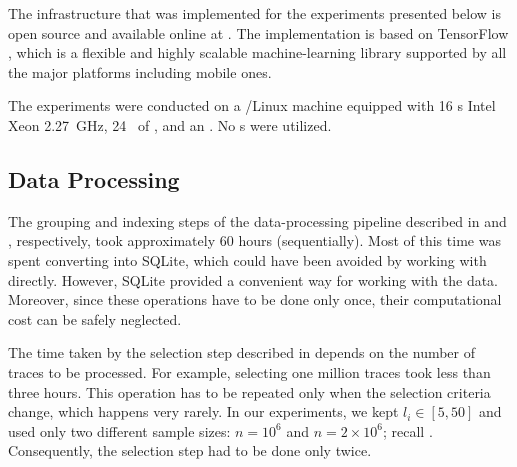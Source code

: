 The infrastructure that was implemented for the experiments presented below is
open source and available online at \cite{sources}. The implementation is based
on TensorFlow \cite{abadi2015}, which is a flexible and highly scalable
machine-learning library supported by all the major platforms including mobile
ones.

The experiments were conducted on a /Linux machine equipped with 16
s Intel Xeon  2.27~GHz, 24~ of , and an
. No s were utilized.

\subsection{Data Processing}
The grouping and indexing steps of the data-processing pipeline described in
 and , respectively, took approximately 60 hours
(sequentially). Most of this time was spent converting  into SQLite,
which could have been avoided by working with  directly. However, SQLite
provided a convenient way for working with the data. Moreover, since these
operations have to be done only once, their computational cost can be safely
neglected.

The time taken by the selection step described in  depends on
the number of traces to be processed. For example, selecting one million traces
took less than three hours. This operation has to be repeated only when the
selection criteria change, which happens very rarely. In our experiments, we
kept $l_i \in [5, 50]$ and used only two different sample sizes: $n = 10^6$ and
$n = 2 \times 10^6$; recall . Consequently, the selection step had
to be done only twice.
